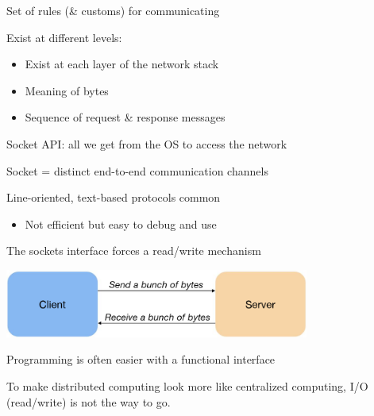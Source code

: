 \begin{slide}

	
	Set of rules (\& customs) for communicating
	\bigskip
	
	Exist at different levels:
	\begin{itemize}
		\item Exist at each layer of the network stack
		\item Meaning of bytes
		\item Sequence of request \& response messages
	\end{itemize}

\end{slide}

\begin{slide}

	
	Socket API: all we get from the OS to access the network
	\bigskip
	
	Socket = distinct end-to-end communication channels
	\bigskip
	
	Line-oriented, text-based protocols common
	\begin{itemize}
		\item Not efficient but easy to debug and use
	\end{itemize}

\end{slide}

\begin{slide}

	
	The sockets interface forces a read/write mechanism
	\bigskip
	
	\includegraphics[width=100mm]{socket-api-problem.png}
	\bigskip
	
	Programming is often easier with a functional interface
	\bigskip
	
	To make distributed computing look more like centralized computing, I/O (read/write) is not the way to go.
	
\end{slide}
    

